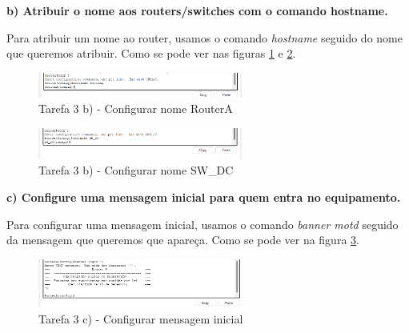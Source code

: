\documentclass[11pt,english, openright, oneside]{book}
\begin{document}
\vspace{0.8cm}

\textbf{b) Atribuir o nome aos routers/switches com o comando hostname.}
\vspace{0.2cm}

Para atribuir um nome ao router, usamos o comando \textit{hostname} seguido do
nome que queremos atribuir. Como se pode ver nas figuras \ref{fig:3b.1} e
\ref{fig:3b.2}.
\vspace{0.2cm}

\begin{figure}[H]
    \centering
    \includegraphics[width=0.6\textwidth]{imagens/Tarefa3/3.b.1.png}
    \caption{Tarefa 3 b) - Configurar nome RouterA}
    \label{fig:3b.1}
\end{figure}

\begin{figure}[H]
    \centering
    \includegraphics[width=0.6\textwidth]{imagens/Tarefa3/3.b.2.png}
    \caption{Tarefa 3 b) - Configurar nome SW\_DC}
    \label{fig:3b.2}
\end{figure}

\vspace{0.8cm}

\textbf{c) Configure uma mensagem inicial para quem entra no equipamento.}
\vspace{0.2cm}

Para configurar uma mensagem inicial, usamos o comando \textit{banner motd}
seguido da mensagem que queremos que apareça. Como se pode ver na figura
\ref{fig:3c}.
\vspace{0.2cm}

\begin{figure}[H]
    \centering
    \includegraphics[width=0.6\textwidth]{imagens/Tarefa3/3.c.png}
    \caption{Tarefa 3 c) - Configurar mensagem inicial}
    \label{fig:3c}
\end{figure}

\vspace{0.8cm}
\end{document}
